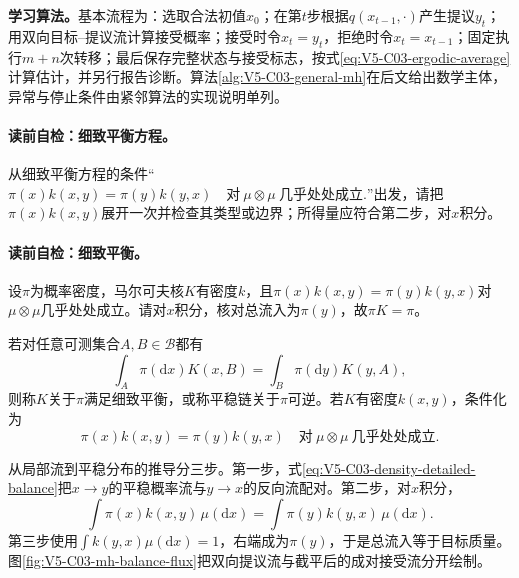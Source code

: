 \label{struct:V5-C03-CH10}
\textbf{学习算法。}基本流程为：选取合法初值$x_0$；在第$t$步根据$q(x_{t-1},\cdot)$产生提议$y_t$；用双向目标--提议流计算接受概率；接受时令$x_t=y_t$，拒绝时令$x_t=x_{t-1}$；固定执行$m+n$次转移；最后保存完整状态与接受标志，按式\eqref{eq:V5-C03-ergodic-average}计算估计，并另行报告诊断。算法\ref{alg:V5-C03-general-mh}在后文给出数学主体，异常与停止条件由紧邻算法的实现说明单列。

\paragraph{读前自检：细致平衡方程。}从细致平衡方程的条件“$\pi(x)k(x,y)=\pi(y)k(y,x) \quad\text{对}\ \mu\otimes\mu\ \text{几乎处处成立}.$”出发，请把$\pi(x)k(x,y)$展开一次并检查其类型或边界；所得量应符合第二步，对$x$积分。\par

\label{struct:V5-C03-CH11}
\paragraph{读前自检：细致平衡。}设$\pi$为概率密度，马尔可夫核$K$有密度$k$，且$\pi(x)k(x,y)=\pi(y)k(y,x)$对$\mu\otimes\mu$几乎处处成立。请对$x$积分，核对总流入为$\pi(y)$，故$\pi K=\pi$。\par

\begin{definition}[细致平衡]
若对任意可测集合$A,B\in\mathcal B$都有
\begin{equation}\label{eq:V5-C03-general-detailed-balance}
\int_A\pi(\mathrm dx)K(x,B)
=\int_B\pi(\mathrm dy)K(y,A),
\end{equation}
则称$K$关于$\pi$满足细致平衡，或称平稳链关于$\pi$可逆。若$K$有密度$k(x,y)$，条件化为
\begin{equation}\label{eq:V5-C03-density-detailed-balance}
\pi(x)k(x,y)=\pi(y)k(y,x)
\quad\text{对}\ \mu\otimes\mu\ \text{几乎处处成立}.
\end{equation}
\end{definition}

从局部流到平稳分布的推导分三步。第一步，式\eqref{eq:V5-C03-density-detailed-balance}把$x\to y$的平稳概率流与$y\to x$的反向流配对。第二步，对$x$积分，
\[
\int\pi(x)k(x,y)\,\mu(\mathrm dx)
=\int\pi(y)k(y,x)\,\mu(\mathrm dx).
\]
第三步使用$\int k(y,x)\mu(\mathrm dx)=1$，右端成为$\pi(y)$，于是总流入等于目标质量。图\ref{fig:V5-C03-mh-balance-flux}把双向提议流与截平后的成对接受流分开绘制。


